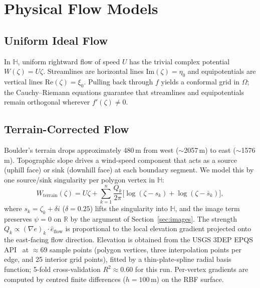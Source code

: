 \documentclass[11pt]{article}
\newcommand{\HH}{\mathbb{H}}          %
\newcommand{\RR}{\mathbb{R}}
\newcommand{\Imag}{\mathrm{Im}}
\newcommand{\Real}{\mathrm{Re}}
\begin{document}
\section{Physical Flow Models}
\label{sec:models}

\subsection{Uniform Ideal Flow}

In $\HH$, uniform rightward flow of speed $U$ has the trivial complex potential
$W(\zeta)=U\zeta$. Streamlines are horizontal lines $\Imag(\zeta)=\eta_0$
and equipotentials are vertical lines $\Real(\zeta)=\xi_0$. Pulling back
through $f$ yields a conformal grid in $\Omega$; the Cauchy--Riemann equations
guarantee that streamlines and equipotentials remain orthogonal wherever
$f'(\zeta)\neq0$.

\subsection{Terrain-Corrected Flow}
\label{sec:terrain}

Boulder's terrain drops approximately 480\,m from west ($\sim$2057\,m) to east
($\sim$1576\,m). Topographic slope drives a wind-speed component that acts as a
source (uphill face) or sink (downhill face) at each boundary segment. We model
this by one source/sink singularity per polygon vertex in $\HH$:
\begin{equation}
  W_{\mathrm{terrain}}(\zeta) = U\zeta
  + \sum_{k=1}^{n}\frac{Q_k}{2\pi}
    \bigl[\log(\zeta-s_k)+\log(\zeta-\bar{s}_k)\bigr],
  \label{eq:terrain}
\end{equation}
where $s_k = \zeta_k + \delta i$ ($\delta=0.25$) lifts the singularity into $\HH$,
and the image term preserves $\psi=0$ on $\RR$ by the argument of
Section~\ref{sec:images}. The strength
$Q_k \propto (\nabla e)_k\cdot\hat{e}_{\mathrm{flow}}$
is proportional to the local elevation gradient projected onto the east-facing
flow direction. Elevation is obtained from the USGS 3DEP EPQS API~\citep{USGS3DEP}
at $\approx69$ sample points (polygon vertices, three interpolation points per
edge, and 25 interior grid points), fitted by a thin-plate-spline radial basis
function; 5-fold cross-validation $R^2\approx0.60$ for this run. Per-vertex
gradients are computed by centred finite differences ($h=100$\,m) on the RBF
surface.
\end{document}
